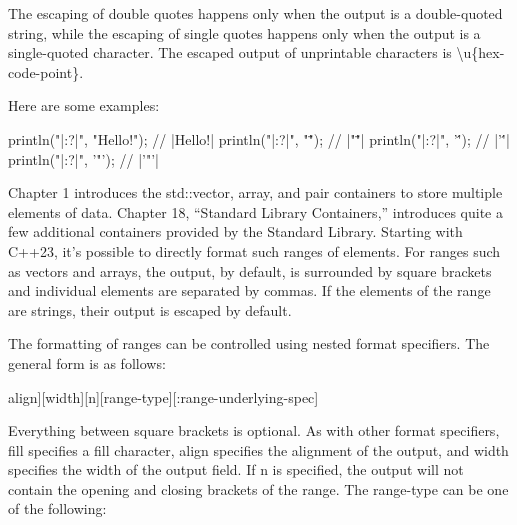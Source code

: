 The escaping of double quotes happens only when the output is a double-quoted string, while the escaping of single quotes happens only when the output is a single-quoted character. The escaped output of unprintable characters is \textbackslash{}u\{hex-code-point\}.

Here are some examples:

\begin{cpp}
println("|{:?}|", "Hello\tWorld!\n");   // |Hello\tWorld!\n|
println("|{:?}|", "\"");                // |"\""|
println("|{:?}|", '\'');                // |'\''|
println("|{:?}|", '"');                 // |'"'|
\end{cpp}



Chapter 1 introduces the std::vector, array, and pair containers to store multiple elements of data. Chapter 18, “Standard Library Containers,” introduces quite a few additional containers provided by the Standard Library. Starting with C++23, it’s possible to directly format such ranges of elements. For ranges such as vectors and arrays, the output, by default, is surrounded by square brackets and individual elements are separated by commas. If the elements of the range are strings, their output is escaped by default.

The formatting of ranges can be controlled using nested format specifiers. The general form is as follows:

\begin{shell}
[[fill]align][width][n][range-type][:range-underlying-spec]
\end{shell}

Everything between square brackets is optional. As with other format specifiers, fill specifies a fill character, align specifies the alignment of the output, and width specifies the width of the output field. If n is specified, the output will not contain the opening and closing brackets of the range. The range-type can be one of the following:

